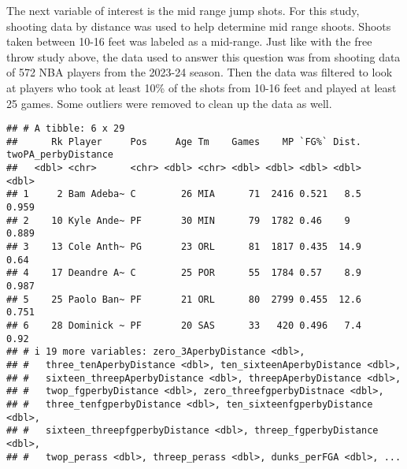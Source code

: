 \documentclass[
]{article}
\newenvironment{Shaded}{\begin{snugshade}}{\end{snugshade}}
\newcommand{\DecValTok}[1]{\textcolor[rgb]{0.00,0.00,0.81}{#1}}
\newcommand{\FunctionTok}[1]{\textcolor[rgb]{0.13,0.29,0.53}{\textbf{#1}}}
\newcommand{\NormalTok}[1]{#1}
\newcommand{\OtherTok}[1]{\textcolor[rgb]{0.56,0.35,0.01}{#1}}
\newcommand{\SpecialCharTok}[1]{\textcolor[rgb]{0.81,0.36,0.00}{\textbf{#1}}}
\newcommand{\StringTok}[1]{\textcolor[rgb]{0.31,0.60,0.02}{#1}}
\begin{document}
The next variable of interest is the mid range jump shots. For this
study, shooting data by distance was used to help determine mid range
shoots. Shoots taken between 10-16 feet was labeled as a mid-range. Just
like with the free throw study above, the data used to answer this
question was from shooting data of 572 NBA players from the 2023-24
season. Then the data was filtered to look at players who took at least
10\% of the shots from 10-16 feet and played at least 25 games. Some
outliers were removed to clean up the data as well.

\begin{Shaded}
\end{Shaded}

\begin{verbatim}
## # A tibble: 6 x 29
##      Rk Player     Pos     Age Tm    Games    MP `FG%` Dist. twoPA_perbyDistance
##   <dbl> <chr>      <chr> <dbl> <chr> <dbl> <dbl> <dbl> <dbl>               <dbl>
## 1     2 Bam Adeba~ C        26 MIA      71  2416 0.521   8.5               0.959
## 2    10 Kyle Ande~ PF       30 MIN      79  1782 0.46    9                 0.889
## 3    13 Cole Anth~ PG       23 ORL      81  1817 0.435  14.9               0.64 
## 4    17 Deandre A~ C        25 POR      55  1784 0.57    8.9               0.987
## 5    25 Paolo Ban~ PF       21 ORL      80  2799 0.455  12.6               0.751
## 6    28 Dominick ~ PF       20 SAS      33   420 0.496   7.4               0.92 
## # i 19 more variables: zero_3AperbyDistance <dbl>,
## #   three_tenAperbyDistance <dbl>, ten_sixteenAperbyDistance <dbl>,
## #   sixteen_threepAperbyDistance <dbl>, threepAperbyDistance <dbl>,
## #   twop_fgperbyDistance <dbl>, zero_threefgperbyDistnace <dbl>,
## #   three_tenfgperbyDistance <dbl>, ten_sixteenfgperbyDistance <dbl>,
## #   sixteen_threepfgperbyDistance <dbl>, threep_fgperbyDistance <dbl>,
## #   twop_perass <dbl>, threep_perass <dbl>, dunks_perFGA <dbl>, ...
\end{verbatim}
\end{document}
